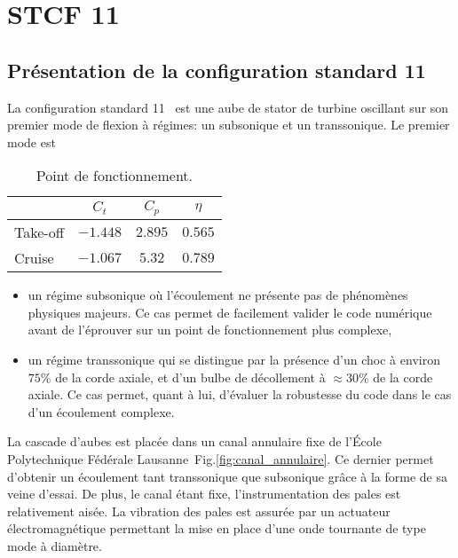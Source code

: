 \chapter{STCF 11}
\label{stcf11}


\section{Présentation de la configuration standard 11}
\label{sec:presentation_stcf11}

La configuration standard 11~\cite{Fransson:1999uq}
est une aube de stator de turbine oscillant sur 
son premier mode de flexion à régimes: un subsonique et un
transsonique. Le premier mode est 

\begin{table}[htbp]
   \centering
  \begin{tabular}{lccc}
    \toprule
    \phantom{abdefghijk}& $C_t$ & $C_p$ & $\eta$ \\
    \midrule
    Take-off & $-1.448$ & $2.895$ & $0.565$ \\
    Cruise & $-1.067$ & $5.32$ & $0.789$ \\
    \bottomrule
  \end{tabular}
  \caption{Point de fonctionnement.}
  \label{tab:flight_condition}
\end{table} 

\begin{itemize}
  \item un régime subsonique où l'écoulement
        ne présente pas de phénomènes physiques majeurs.
        Ce cas permet de facilement valider le code numérique
        avant de l'éprouver sur un point de fonctionnement plus
        complexe,
  \item un régime transsonique qui se distingue par la 
        présence d'un 
        choc à environ $75\%$ de la corde axiale,
        et d'un bulbe de décollement à $\approx 30\%$
        de la corde axiale.
        Ce cas permet, quant à lui, d'évaluer la robustesse
        du code dans le cas d'un écoulement complexe.
\end{itemize}

La cascade d'aubes est placée dans un canal annulaire fixe de l'École
Polytechnique Fédérale Lausanne~Fig.\ref{fig:canal_annulaire}.
Ce dernier permet d'obtenir un écoulement tant transsonique que subsonique
grâce à la forme de sa veine d'essai. De plus, le canal étant fixe,
l'instrumentation des pales est relativement aisée.
La vibration des pales est assurée par un actuateur électromagnétique
permettant la mise en place d'une onde tournante de type mode à diamètre.

